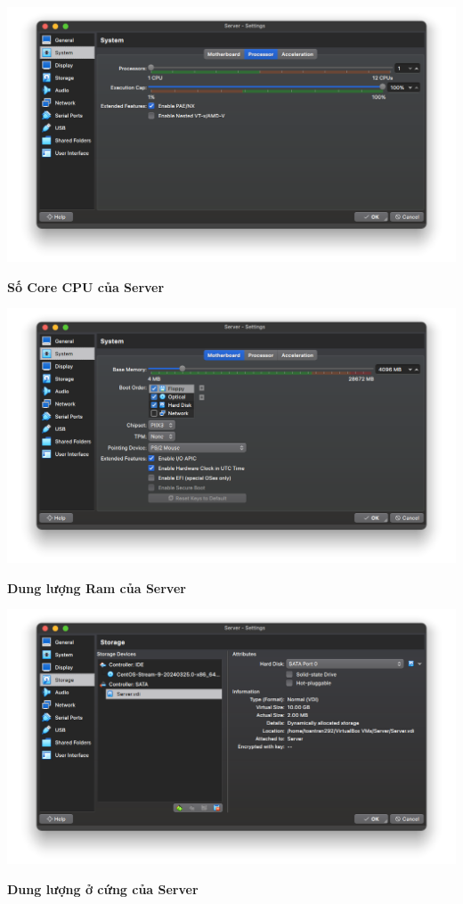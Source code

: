\begin{minipage}{.93\linewidth}
  \captionsetup{type=figure}
  \includegraphics[width=\linewidth]{./imgs/Hinh-4.png}
  \caption{\bfseries Số Core CPU của Server}
  \label{fig:server-processor}
\end{minipage}



\begin{minipage}{.93\linewidth}
  \captionsetup{type=figure}
  \includegraphics[width=\linewidth]{./imgs/Hinh-3.png}
  \caption{\bfseries Dung lượng Ram của Server}
  \label{fig:server-ram}
\end{minipage}


\begin{minipage}{.93\linewidth}
  \captionsetup{type=figure}
  \includegraphics[width=\linewidth]{./imgs/Hinh-5.png}
  \caption{\bfseries Dung lượng ở cứng của Server}
  \label{fig:server-disk}
\end{minipage}


